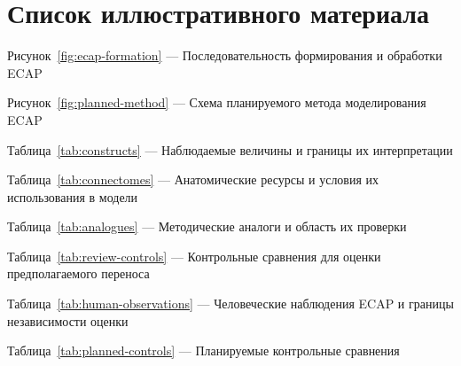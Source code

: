 \chapter*{Список иллюстративного материала}
\noindent Рисунок~\ref{fig:ecap-formation} — Последовательность формирования и обработки ECAP\dotfill\pageref{fig:ecap-formation}\par
\noindent Рисунок~\ref{fig:planned-method} — Схема планируемого метода моделирования ECAP\dotfill\pageref{fig:planned-method}\par
\medskip
\noindent Таблица~\ref{tab:constructs} — Наблюдаемые величины и границы их интерпретации\dotfill\pageref{tab:constructs}\par
\noindent Таблица~\ref{tab:connectomes} — Анатомические ресурсы и условия их использования в модели\dotfill\pageref{tab:connectomes}\par
\noindent Таблица~\ref{tab:analogues} — Методические аналоги и область их проверки\dotfill\pageref{tab:analogues}\par
\noindent Таблица~\ref{tab:review-controls} — Контрольные сравнения для оценки предполагаемого переноса\dotfill\pageref{tab:review-controls}\par
\noindent Таблица~\ref{tab:human-observations} — Человеческие наблюдения ECAP и границы независимости оценки\dotfill\pageref{tab:human-observations}\par
\noindent Таблица~\ref{tab:planned-controls} — Планируемые контрольные сравнения\dotfill\pageref{tab:planned-controls}\par
